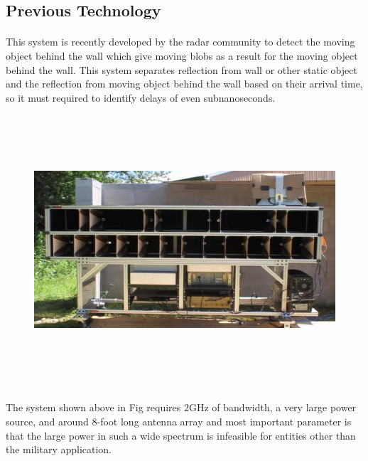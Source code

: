 \documentclass[a4paper,12pt,oneside]{article}
\begin{document}
\paragraph{}









\subsection{Previous Technology}

\paragraph{}
This system is recently developed by the radar community to detect the moving object
behind the wall which give moving blobs as a result for the moving object behind the wall. This
system separates reflection from wall or other static object and the reflection from moving object
behind the wall based on their arrival time, so it must required to identify delays of even subnanoseconds.

\begin{figure}[H]
\centering
\includegraphics[height=10cm,width=14cm]{1.png}
\end{figure}

\paragraph{}
The system shown above in Fig requires 2GHz of bandwidth, a very large power
source, and around 8-foot long antenna array and most important parameter is that the large
power in such a wide spectrum is infeasible for entities other than the military application.
\end{document}

